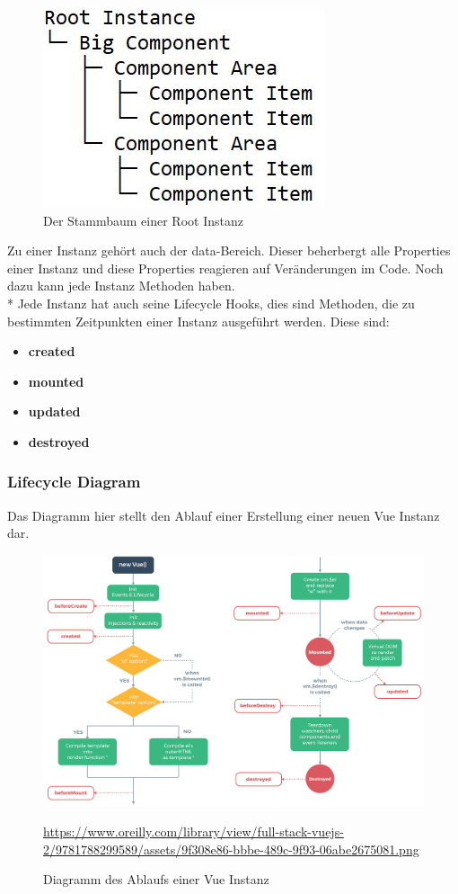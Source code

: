 \begin{figure}[htp]
    \centering
    \includegraphics[scale=1]{pics/RootComponentTree.JPG}
    \caption{Der Stammbaum einer Root Instanz}
    \label{fig:impl:RootComponentTree}
\end{figure}
Zu einer Instanz gehört auch der data-Bereich. Dieser beherbergt alle Properties einer
Instanz und diese Properties reagieren auf Veränderungen im Code. Noch dazu kann jede Instanz Methoden haben. \\*
Jede Instanz hat auch seine Lifecycle Hooks, dies sind Methoden, die zu bestimmten Zeitpunkten einer Instanz ausgeführt werden. \cite{VueGuideInstance}
Diese sind:
\begin{itemize}
    \item \textbf{created}
    \item \textbf{mounted}          
    \item \textbf{updated} 
    \item \textbf{destroyed} 
\end{itemize}
\clearpage

\subsubsection{Lifecycle Diagram}
Das Diagramm hier stellt den Ablauf einer Erstellung einer neuen Vue Instanz dar.

\begin{figure}[htp]
    \centering
    \includegraphics[scale=0.3]{pics/VueInstanceLifeCycle.png}
    \caption{Diagramm des Ablaufs einer Vue Instanz}
        \small \url{https://www.oreilly.com/library/view/full-stack-vuejs-2/9781788299589/assets/9f308e86-bbbe-489c-9f93-06abe2675081.png}
    \label{fig:impl:VueInstanceLifeCycle}
\end{figure}


